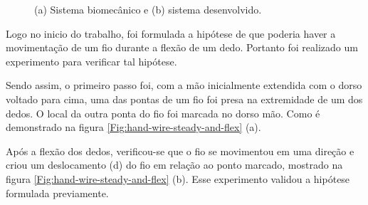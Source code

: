 \documentclass[
	12pt,				%
	openright,			%
	oneside,			%
	a4paper,			%
	english,			%
	brazil				%
	]{abntex2}
\begin{document}
	\begin{figure}[!htb]
		 \centering
		 \caption{(a) Sistema biomecânico e (b) sistema desenvolvido.} 
		 \centering
		 \label{Fig:bio-and-system}
	\end{figure}

		Logo no inicio do trabalho, foi formulada a hipótese de que poderia haver a movimentação de um fio durante a flexão de um dedo. Portanto foi realizado um experimento para verificar tal hipótese. 
		
		Sendo assim, o primeiro passo foi, com a mão inicialmente extendida com o dorso voltado para cima, uma das pontas de um fio foi presa na extremidade de um dos dedos. O local da outra ponta do fio foi marcada no dorso mão. Como é demonstrado na figura \ref{Fig:hand-wire-steady-and-flex} (a).

			Após a flexão dos dedos, verificou-se que o fio se movimentou em uma direção e criou um deslocamento (d) do fio em relação ao ponto marcado, mostrado na figura \ref{Fig:hand-wire-steady-and-flex} (b). Esse experimento validou a hipótese formulada previamente. 
\end{document}
